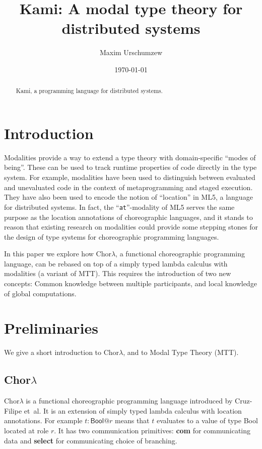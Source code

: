 \documentclass{scrartcl}
\title{Kami: A modal type theory for distributed systems}
\author{Maxim Urschumzew}
\date{\today}
\theoremstyle{definition}
\theoremstyle{plain}
\begin{document}
\maketitle


\newcommand{\primitive}[1]{\textsf{\textbf{#1}}}
\newcommand{\primitiveMath}[1]{\mathsf{\mathbf{#1}}}
\newcommand{\ChorMTT}{Chor${}_{\textrm{MTT}}$}
\newcommand{\onleftarrow}[1]{\mathop{\smash{\xleftarrow{#1}}}}
\newcommand{\ProcMTT}{Proc${}_{\textrm{MTT}}$}


\begin{abstract}
  Kami, a programming language for distributed systems.
\end{abstract}


\section{Introduction}
Modalities provide a way to extend a type theory with domain-specific
``modes of being''. These can be used to track runtime properties of code
directly in the type system. For example, modalities have been used to
distinguish between evaluated and unevaluated code in the context of
metaprogramming and staged execution\cite{davies2001modal}. They have also been used to encode the
notion of ``location'' in ML5\cite{murphy2008modal}, a language for distributed
systems. In fact, the ``\texttt{at}''-modality of ML5 serves the same purpose as the
location annotations of choreographic
languages\cite{cruz2022functional,giallorenzo2005object}, and it stands to
reason that existing research on modalities could provide some stepping stones
for the design of type systems for choreographic programming languages.

\medskip

In this paper we explore how Chor$\lambda$\cite{cruz2022functional}, a functional choreographic
programming language, can be rebased on top of a simply typed lambda calculus
with modalities (a variant of MTT\cite{gratzer2023syntax}).
This requires the introduction of two new concepts: Common
knowledge between multiple participants, and local knowledge of global computations.

\section{Preliminaries}
We give a short introduction to Chor$\lambda$, and to Modal Type Theory (MTT).

\subsection{Chor$\lambda$}
Chor$\lambda$\cite{cruz2022functional} is a functional choreographic programming language introduced by
Cruz-Filipe et~al. It is an extension of simply typed lambda calculus with
location annotations. For example $t :
\textsf{Bool} @ r$ means that $t$ evaluates to a value of type \textsf{Bool}
located at role $r$. It has two communication primitives: \primitive{com} for
communicating data and \primitive{select} for communicating choice of branching.
\end{document}
